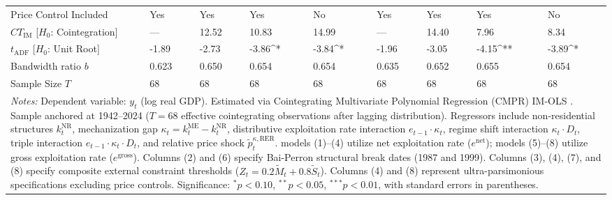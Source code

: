 \begin{table}[h!]
\begin{tabular}{p{3.5cm}p{1.35cm}p{1.35cm}p{1.35cm}p{1.35cm}p{1.35cm}p{1.35cm}p{1.35cm}p{1.35cm}}
Price Control Included & Yes & Yes & Yes & No & Yes & Yes & Yes & No \\
$CT_{\text{IM}}$ [$H_0$: Cointegration] & — & 12.52 & 10.83 & 14.99 & — & 14.40 & 7.96 & 8.34 \\
$t_{\text{ADF}}$ [$H_0$: Unit Root] & -1.89 & -2.73 & -3.86^{*} & -3.84^{*} & -1.96 & -3.05 & -4.15^{**} & -3.89^{*} \\
Bandwidth ratio $b$ & 0.623 & 0.650 & 0.654 & 0.654 & 0.635 & 0.652 & 0.655 & 0.654 \\
Sample Size $T$ & 68 & 68 & 68 & 68 & 68 & 68 & 68 & 68 \\
		\bottomrule
		\multicolumn{9}{p{14.3cm}}{\footnotesize \textit{Notes:} Dependent variable: $y_t$ (log real GDP). Estimated via Cointegrating Multivariate Polynomial Regression (CMPR) IM-OLS \citep{VogelsangWagner2024}. Sample anchored at 1942--2024 ($T=68$ effective cointegrating observations after lagging distribution). Regressors include non-residential structures $k_t^{\text{NR}}$, mechanization gap $\kappa_t = k_t^{\text{ME}} - k_t^{\text{NR}}$, distributive exploitation rate interaction $e_{t-1} \cdot \kappa_t$, regime shift interaction $\kappa_t \cdot D_t$, triple interaction $e_{t-1} \cdot \kappa_t \cdot D_t$, and relative price shock $\tilde{p}_t^{\kappa, \text{RER}}$. models (1)--(4) utilize net exploitation rate ($e^{\text{net}}$); models (5)--(8) utilize gross exploitation rate ($e^{\text{gross}}$). Columns (2) and (6) specify Bai-Perron structural break dates (1987 and 1999). Columns (3), (4), (7), and (8) specify composite external constraint thresholds ($Z_t = 0.2 \tilde{M}_t + 0.8 \tilde{S}_t$). Columns (4) and (8) represent ultra-parsimonious specifications excluding price controls. Significance: $^*p<0.10$, $^{**}p<0.05$, $^{***}p<0.01$, with standard errors in parentheses.} \\
	\end{tabular}
\end{table}